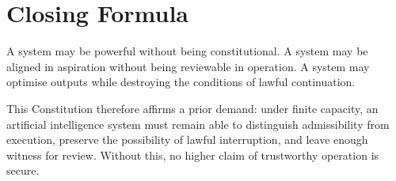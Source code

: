 \documentclass[11pt]{article}
\begin{document}
\section*{Closing Formula}

A system may be powerful without being constitutional.  
A system may be aligned in aspiration without being reviewable in operation.  
A system may optimise outputs while destroying the conditions of lawful continuation.  

This Constitution therefore affirms a prior demand: under finite capacity, an artificial intelligence system must remain able to distinguish admissibility from execution, preserve the possibility of lawful interruption, and leave enough witness for review. Without this, no higher claim of trustworthy operation is secure.
\end{document}
